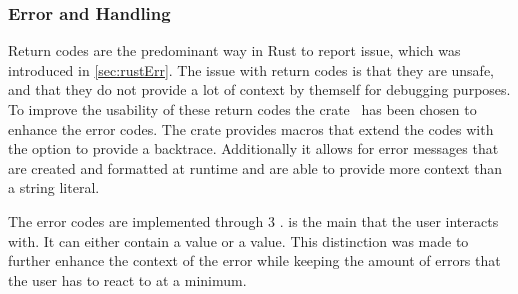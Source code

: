 \documentclass[thesis]{subfiles}
\begin{document}
    \subsubsection{Error and Handling}
      Return codes are the predominant way in Rust to report issue, which was introduced in \autoref{sec:rustErr}.
      The issue with return codes is that they are unsafe, and that they do not provide a lot of context by themself for debugging purposes.
      To improve the usability of these return codes the  crate~\autocite{rust-failure} has been chosen to enhance the error codes.
      The crate provides macros that extend the codes with the option to provide a backtrace.
      Additionally it allows for error messages that are created and formatted at runtime and are able to provide more context than a string literal.

      The error codes are implemented through 3 \enums.
      \SkillFail is the main \enum that the user interacts with.
      It can either contain a  \enum value or a  \enum value.
      This distinction was made to further enhance the context of the error while keeping the amount of errors that the user has to react to at a minimum.
\end{document}
